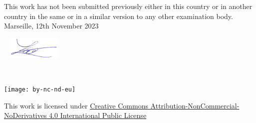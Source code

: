     This work has not been submitted previously either in this country or in another country in the same or in a similar version to any other examination body.\\
    
    Marseille, 12th November 2023
    
    \begin{flushright}\includegraphics[width=120px,height=40px]{logo/signature.png}\end{flushright}%

    ~\vfill
    \begin{center}
        \begin{minipage}[c]{0.25\linewidth}
            \texttt{[image: by-nc-nd-eu]}
        \end{minipage}\hfill
    \end{center}

    This work is licensed under \href{https://creativecommons.org/licenses/by-nc-nd/4.0/deed.en}{Creative Commons Attribution-NonCommercial-NoDerivatives 4.0 International Public License}
\fi

